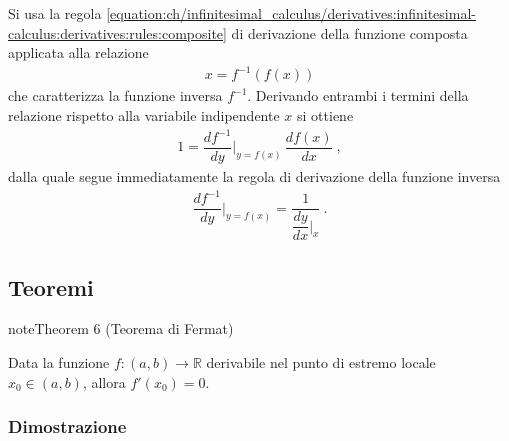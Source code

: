 \documentclass[letterpaper,10pt,italian]{jupyterBook}
\begin{document}
\sphinxAtStartPar
Si usa la regola \eqref{equation:ch/infinitesimal_calculus/derivatives:infinitesimal-calculus:derivatives:rules:composite} di derivazione della funzione composta applicata alla relazione
\begin{equation*}
\begin{split}x = f^{-1} \left( f(x) \right)\end{split}
\end{equation*}
\sphinxAtStartPar
che caratterizza la funzione inversa \(f^{-1}\). Derivando entrambi i termini della relazione rispetto alla variabile indipendente \(x\) si ottiene
\begin{equation*}
\begin{split}1 = \dfrac{d f^{-1}}{d y}\bigg|_{y = f(x)} \, \dfrac{d f(x)}{d x} \ ,\end{split}
\end{equation*}
\sphinxAtStartPar
dalla quale segue immediatamente la regola di derivazione della funzione inversa
\begin{equation*}
\begin{split} \dfrac{d f^{-1}}{d y}\bigg|_{y = f(x)} = \dfrac{1}{ \dfrac{d y}{d x}\bigg|_{x}} \ .\end{split}
\end{equation*}

\subsection{Teoremi}
\label{\detokenize{ch/infinitesimal_calculus/derivatives:teoremi}}\label{\detokenize{ch/infinitesimal_calculus/derivatives:infinitesimal-calculus-derivatives-thm}}\label{ch/infinitesimal_calculus/derivatives:thm:infinitesimal-calculus:derivatives:thm:fermat}
\begin{sphinxadmonition}{note}{Theorem 6 (Teorema di Fermat)}



\sphinxAtStartPar
Data la funzione \(f: (a,b) \rightarrow \mathbb{R}\) derivabile nel punto di estremo locale \(x_0 \in (a,b)\), allora \(f'(x_0) = 0\).
\end{sphinxadmonition}
\subsubsection*{Dimostrazione}
\end{document}
